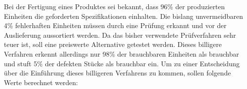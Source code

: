 \documentclass{abgabe}
\begin{document}
\begin{questions}
    \question
    Bei der Fertigung eines Produktes sei bekannt, dass 96\% der produzierten Einheiten die geforderten Spezifikationen einhalten. 
    Die bislang unvermeidbaren 4\% fehlerhaften Einheiten müssen durch eine Prüfung erkannt und vor der Auslieferung aussortiert werden.
    Da das bisher verwendete Prüfverfahren sehr teuer ist, soll eine preiswerte Alternative getestet werden. 
    Dieses billigere Verfahren erkennt allerdings nur 98\% der brauchbaren Einheiten als brauchbar und stuft 5\% der defekten Stücke als brauchbar ein. 
    Um zu einer Entscheidung über die Einführung dieses billigeren Verfahrens zu kommen, sollen folgende Werte berechnet werden:
\end{questions}
\end{document}
